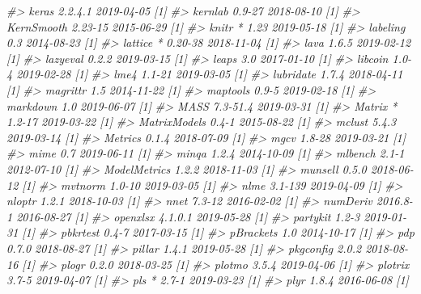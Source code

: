 \documentclass[]{krantz}
\makeatletter
\newenvironment{Shaded}{\begin{snugshade}}{\end{snugshade}}
\newcommand{\CommentTok}[1]{\textcolor[rgb]{0.37,0.37,0.37}{\textit{#1}}}
\newenvironment{kframe}{%
\medskip{}
\setlength{\fboxsep}{.8em}
 \def\at@end@of@kframe{}%
 \ifinner\ifhmode%
  \def\at@end@of@kframe{\end{minipage}}%
  \begin{minipage}{\columnwidth}%
 \fi\fi%
 \def\FrameCommand##1{\hskip\@totalleftmargin \hskip-\fboxsep
 \colorbox{shadecolor}{##1}\hskip-\fboxsep
     \hskip-\linewidth \hskip-\@totalleftmargin \hskip\columnwidth}%
 \MakeFramed {\advance\hsize-\width
   \@totalleftmargin\z@ \linewidth\hsize
   \@setminipage}}%
 {\par\unskip\endMakeFramed%
 \at@end@of@kframe}
\renewenvironment{Shaded}{\begin{kframe}}{\end{kframe}}
\makeatother
\begin{document}
\begin{Shaded}
\begin{Highlighting}[]
\CommentTok{#>    keras           2.2.4.1    2019-04-05 [1]}
\CommentTok{#>    kernlab         0.9-27     2018-08-10 [1]}
\CommentTok{#>    KernSmooth      2.23-15    2015-06-29 [1]}
\CommentTok{#>    knitr         * 1.23       2019-05-18 [1]}
\CommentTok{#>    labeling        0.3        2014-08-23 [1]}
\CommentTok{#>    lattice       * 0.20-38    2018-11-04 [1]}
\CommentTok{#>    lava            1.6.5      2019-02-12 [1]}
\CommentTok{#>    lazyeval        0.2.2      2019-03-15 [1]}
\CommentTok{#>    leaps           3.0        2017-01-10 [1]}
\CommentTok{#>    libcoin         1.0-4      2019-02-28 [1]}
\CommentTok{#>    lme4            1.1-21     2019-03-05 [1]}
\CommentTok{#>    lubridate       1.7.4      2018-04-11 [1]}
\CommentTok{#>    magrittr        1.5        2014-11-22 [1]}
\CommentTok{#>    maptools        0.9-5      2019-02-18 [1]}
\CommentTok{#>    markdown        1.0        2019-06-07 [1]}
\CommentTok{#>    MASS            7.3-51.4   2019-03-31 [1]}
\CommentTok{#>    Matrix        * 1.2-17     2019-03-22 [1]}
\CommentTok{#>    MatrixModels    0.4-1      2015-08-22 [1]}
\CommentTok{#>    mclust          5.4.3      2019-03-14 [1]}
\CommentTok{#>    Metrics         0.1.4      2018-07-09 [1]}
\CommentTok{#>    mgcv            1.8-28     2019-03-21 [1]}
\CommentTok{#>    mime            0.7        2019-06-11 [1]}
\CommentTok{#>    minqa           1.2.4      2014-10-09 [1]}
\CommentTok{#>    mlbench         2.1-1      2012-07-10 [1]}
\CommentTok{#>    ModelMetrics    1.2.2      2018-11-03 [1]}
\CommentTok{#>    munsell         0.5.0      2018-06-12 [1]}
\CommentTok{#>    mvtnorm         1.0-10     2019-03-05 [1]}
\CommentTok{#>    nlme            3.1-139    2019-04-09 [1]}
\CommentTok{#>    nloptr          1.2.1      2018-10-03 [1]}
\CommentTok{#>    nnet            7.3-12     2016-02-02 [1]}
\CommentTok{#>    numDeriv        2016.8-1   2016-08-27 [1]}
\CommentTok{#>    openxlsx        4.1.0.1    2019-05-28 [1]}
\CommentTok{#>    partykit        1.2-3      2019-01-31 [1]}
\CommentTok{#>    pbkrtest        0.4-7      2017-03-15 [1]}
\CommentTok{#>    pBrackets       1.0        2014-10-17 [1]}
\CommentTok{#>    pdp             0.7.0      2018-08-27 [1]}
\CommentTok{#>    pillar          1.4.1      2019-05-28 [1]}
\CommentTok{#>    pkgconfig       2.0.2      2018-08-16 [1]}
\CommentTok{#>    plogr           0.2.0      2018-03-25 [1]}
\CommentTok{#>    plotmo          3.5.4      2019-04-06 [1]}
\CommentTok{#>    plotrix         3.7-5      2019-04-07 [1]}
\CommentTok{#>    pls           * 2.7-1      2019-03-23 [1]}
\CommentTok{#>    plyr            1.8.4      2016-06-08 [1]}

\end{Highlighting}
\end{Shaded}
\end{document}
